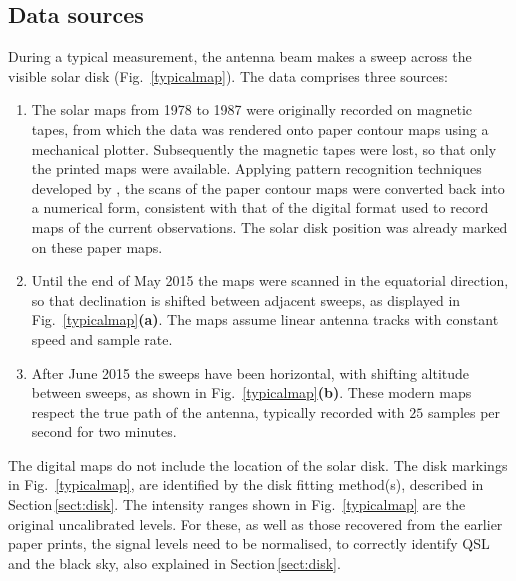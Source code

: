 \documentclass{aa}
\begin{document}
\subsection{Data sources}\label{sect:source}

  During a typical measurement, the antenna beam makes a sweep across the
  visible solar disk (Fig.~\ref{typicalmap}).
  The data comprises three sources:
  \begin{enumerate}[A]
    \item
    The solar maps from 1978 to 1987 were originally recorded on magnetic
    tapes, from which the data was rendered onto paper contour maps using a
    mechanical plotter.
    Subsequently the magnetic tapes were lost, so that only the printed maps
    were available. 
    Applying pattern recognition techniques developed by
    \cite{masterthesis}, the scans of the paper contour maps were converted
    back into a numerical form, consistent with that of 
    the digital format used to record maps of the current observations.
    The solar disk position was already marked on these paper maps.
    \item
    Until the end of May 2015 the maps were scanned in the equatorial direction,
    so that declination is shifted between adjacent sweeps, as displayed in
    Fig.~\ref{typicalmap}{\bf(a)}.
    The maps assume linear antenna tracks with constant speed and sample rate.
    \item
    After June 2015 the sweeps have been horizontal, with shifting altitude
    between sweeps, as shown in Fig.~\ref{typicalmap}{\bf(b)}.
    These modern maps respect the true path of the antenna, typically recorded
    with $25$ samples per second for two minutes.
  \end{enumerate}

  The digital maps do not include the location of the solar disk.
  The disk markings in Fig.~\ref{typicalmap}, are identified by the 
  disk fitting method(s), described in Section\,\ref{sect:disk}.
  The intensity ranges shown in Fig.~\ref{typicalmap} are the original
  uncalibrated levels.
  For these, as well as those recovered from the earlier paper prints, the 
  signal levels need to be normalised, to correctly identify QSL and the
  black sky, also explained in Section\,\ref{sect:disk}.
\end{document}
